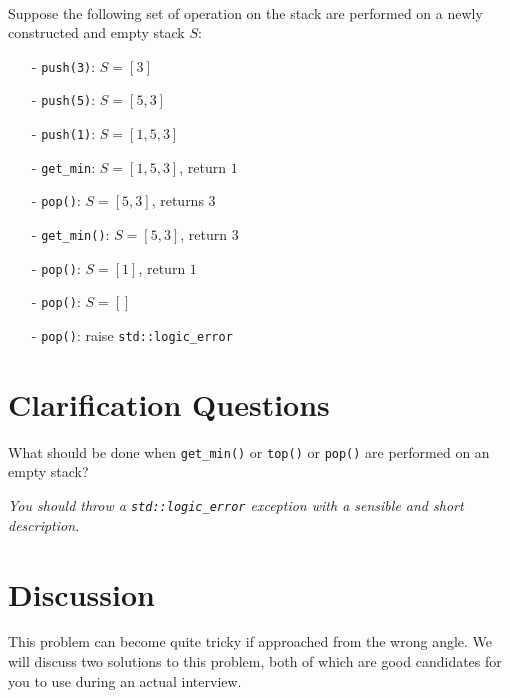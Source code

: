 \begin{exercise}
	\begin{example}
		\hfill \\
		Suppose the following set of operation on the stack are performed on a newly constructed and empty stack $S$:
		\begin{itemize}
			\item[-] \lstinline[columns=fixed]{push(3)}: $S=[3]$
			\item[-] \lstinline[columns=fixed]{push(5)}: $S=[5,3]$
			\item[-] \lstinline[columns=fixed]{push(1)}: $S=[1,5,3]$
			\item[-] \lstinline[columns=fixed]{get_min}: $S=[1,5,3]$, return $1$
			\item[-] \lstinline[columns=fixed]{pop()}: $S=[5,3]$, returns $3$
			\item[-] \lstinline[columns=fixed]{get_min()}: $S=[5,3]$, return $3$
			\item[-] \lstinline[columns=fixed]{pop()}: $S=[1]$, return $1$
			\item[-] \lstinline[columns=fixed]{pop()}: $S=[]$
			\item[-] \lstinline[columns=fixed]{pop()}: raise \lstinline[columns=fixed]{std::logic_error}
		\end{itemize}
		
	\end{example}
\end{exercise}

\section{Clarification Questions}

\begin{QandA}
	\item What should be done when \lstinline[columns=fixed]{get_min()} or \lstinline[columns=fixed]{top()} or \lstinline[columns=fixed]{pop()} are performed on an empty stack?
	\begin{answered}
		\textit{You should throw a \lstinline[columns=fixed]{std::logic_error} exception with a sensible and short description.}
	\end{answered}
	
\end{QandA}

\section{Discussion}
\label{min_stack:sec:discussion}
This problem can become quite tricky if approached from the wrong angle. We will discuss two solutions to this problem, both of which are good candidates for you to use during an actual interview. 

